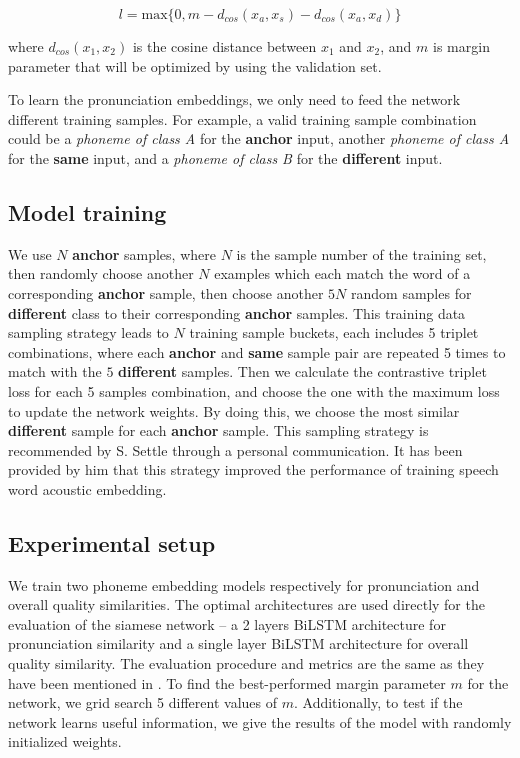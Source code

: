 \begin{equation}
l = \textrm{max}\{0,m-d_{cos}(x_a, x_s)-d_{cos}(x_a, x_d)\}
\end{equation}

where $d_{cos}(x_1, x_2)$ is the cosine distance between $x_1$ and $x_2$, and $m$ is margin parameter that will be optimized by using the validation set.

To learn the pronunciation embeddings, we only need to feed the network different training samples. For example, a valid training sample combination could be a \textit{phoneme of class A} for the \textbf{anchor} input, another \textit{phoneme of class A} for the \textbf{same} input, and a \textit{phoneme of class B} for the \textbf{different} input.

\subsection{Model training}

We use $N$ \textbf{anchor} samples, where $N$ is the sample number of the training set, then randomly choose another $N$ examples which each match the word of a corresponding \textbf{anchor} sample, then choose another $5N$ random samples for \textbf{different} class to their corresponding \textbf{anchor} samples. This training data sampling strategy leads to $N$ training sample buckets, each includes 5 triplet combinations, where each \textbf{anchor} and \textbf{same} sample pair are repeated 5 times to match with the $5$ \textbf{different} samples. Then we calculate the contrastive triplet loss for each 5 samples combination, and choose the one with the maximum loss to update the network weights. By doing this, we choose the most similar \textbf{different} sample for each \textbf{anchor} sample. This sampling strategy is recommended by S. Settle \cite{Settle2016a} through a personal communication. It has been provided by him that this strategy improved the performance of training speech word acoustic embedding.

\subsection{Experimental setup}

We train two phoneme embedding models respectively for pronunciation and overall quality similarities. The optimal architectures are used directly for the evaluation of the siamese network -- a 2 layers \gls{BiLSTM} architecture for pronunciation similarity and a single layer \gls{BiLSTM} architecture for overall quality similarity. The evaluation procedure and metrics are the same as they have been mentioned in . To find the best-performed margin parameter $m$ for the network, we grid search 5 different values of $m$. Additionally, to test if the network learns useful information, we give the results of the model with randomly initialized weights.


